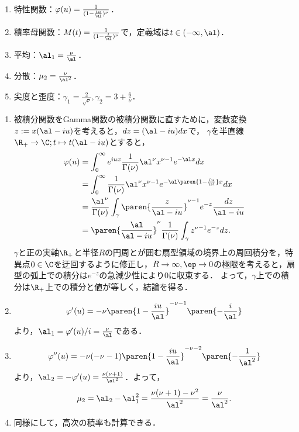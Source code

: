 \documentclass[uplatex,dvipdfmx]{jsreport}
\begin{document}
\begin{proposition}[Gamma分布の特性値]\mbox{}
    \begin{enumerate}
        \item 特性関数：$\varphi(u)=\frac{1}{(1-\frac{iu}{\al})^\nu}$．
        \item 積率母関数：$M(t)=\frac{1}{(1-\frac{t}{\al})^\nu}$で，定義域は$t\in(-\infty,\al)$．
        \item 平均：$\al_1=\frac{\nu}{\al}$．
        \item 分散：$\mu_2=\frac{\nu}{\al^2}$．
        \item 尖度と歪度：$\gamma_1=\frac{2}{\sqrt{\nu}},\gamma_2=3+\frac{6}{\nu}$．
    \end{enumerate}
\end{proposition}
\begin{Proof}\mbox{}
    \begin{enumerate}
        \item 被積分関数をGamma関数の被積分関数に直すために，変数変換$z:=x(\al-iu)$を考えると，$dz=(\al-iu)dx$で，
        $\gamma$を半直線$\R_+\to\C;t\mapsto t(\al-iu)$とすると，
        \begin{align*}
            \varphi(u)&=\int^\infty_0e^{iux}\frac{1}{\Gamma(\nu)}\al^\nu x^{\nu-1}e^{-\al x}dx\\
            &=\int^\infty_0\frac{1}{\Gamma(\nu)}\al^\nu x^{\nu-1}e^{-\al\paren{1-\frac{iu}{\al}}x}dx\\
            &=\frac{\al^\nu}{\Gamma(\nu)}\int_{\gamma}\paren{\frac{z}{\al-iu}}^{\nu-1}e^{-z}\frac{dz}{\al-iu}\\
            &=\paren{\frac{\al}{\al-iu}}^\nu\frac{1}{\Gamma(\nu)}\int_\gamma z^{\nu-1}e^{-z}dz.
        \end{align*}
        $\gamma$と正の実軸$\R_+$と半径$R$の円周とが囲む扇型領域の境界上の周回積分を，特異点$0\in\C$を迂回するように修正し，$R\to\infty,\ep\to0$の極限を考えると，扇型の弧上での積分は$e^{-z}$の急減少性により$0$に収束する．
        よって，$\gamma$上での積分は$\R_+$上での積分と値が等しく，結論を得る．
        \item \[\varphi'(u)=-\nu\paren{1-\frac{iu}{\al}}^{-\nu-1}\paren{-\frac{i}{\al}}\]
        より，$\al_1=\varphi'(u)/i=\frac{\nu}{\al}$である．
        \item \[\varphi''(u)=-\nu(-\nu-1)\paren{1-\frac{iu}{\al}}^{-\nu-2}\paren{-\frac{1}{\al^2}}\]
        より，$\al_2=-\varphi'(u)=\frac{\nu(\nu+1)}{\al^2}$．よって，
        \[\mu_2=\al_2-\al_1^2=\frac{\nu(\nu+1)-\nu^2}{\al^2}=\frac{\nu}{\al^2}.\]
        \item 同様にして，高次の積率も計算できる．
    \end{enumerate}
\end{Proof}
\end{document}
